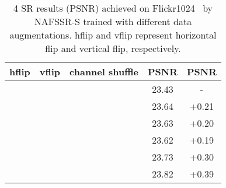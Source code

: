 \documentclass[10pt,twocolumn,letterpaper]{article}
\newcommand{\cmark}{\ding{51}\xspace}\newcommand{\cmarkg}{\textcolor{lightgray}{\ding{51}}\xspace}\newcommand{\xmark}{\ding{55}\xspace}\newcommand{\xmarkg}{\textcolor{lightgray}{\ding{55}}\xspace}
\begin{document}
\begin{table}[t]
\centering
\caption{4 SR results (PSNR) achieved on Flickr1024~\cite{wang2019flickr1024} by NAFSSR-S trained with different data augmentations. hflip and vflip represent horizontal flip and vertical flip, respectively.}
\label{tab:aug}
\vspace{-3mm}
\begin{tabular}{ccccc}
\toprule
hflip & vflip & channel shuffle & PSNR  & PSNR \\
\midrule
\xmarkg     &  \xmarkg    &      \xmarkg         & 23.43 & -            \\
\midrule
\cmark     &    \xmarkg   &   \xmarkg              & 23.64 & +0.21        \\
 \xmarkg     & \cmark     &       \xmarkg          & 23.63 & +0.20        \\
  \xmarkg    &   \xmarkg    & \cmark               & 23.62 & +0.19        \\ \midrule
\cmark     & \cmark     &    \xmarkg             & 23.73 & +0.30        \\
\cmark     & \cmark     & \cmark               & 23.82 & +0.39        \\
\bottomrule
\end{tabular}
\vspace{-2mm}
\end{table}
\end{document}
